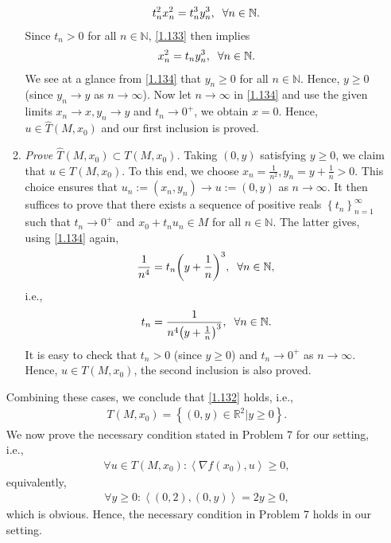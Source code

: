 \documentclass[a4paper]{article}
\numberwithin{equation}{section}
\begin{document}
\begin{enumerate}
\begin{enumerate}
\begin{align}
\label{1.133}
t_n^2x_n^2 = t_n^3y_n^3,\hspace{0.2cm}\forall n \in \mathbb{N}.
\end{align}
Since $t_n>0$ for all $n\in \mathbb{N}$, \eqref{1.133} then implies 
\begin{align}
\label{1.134}
x_n^2 = {t_n}y_n^3,\hspace{0.2cm}\forall n \in \mathbb{N}.
\end{align}
We see at a glance from \eqref{1.134} that $y_n\ge 0$ for all $n\in \mathbb{N}$. Hence, $y\ge 0$ (since $y_n\to y$ as $n\to \infty$). Now let $n\to \infty$ in \eqref{1.134} and use the given limits $x_n\to x,y_n\to y$ and $t_n\to 0^+$, we obtain $x=0$. Hence, $u\in \widehat{T}\left(M,x_0\right)$ and our first inclusion is proved.
\item \textit{Prove $\widehat T\left( {M,{x_0}} \right) \subset T\left( {M,{x_0}} \right)$.} Taking $\left(0,y\right)$ satisfying $y\ge 0$, we claim that $u\in T\left(M,x_0\right)$. To this end, we choose $x_n=\frac{1}{n^2},y_n=y+\frac{1}{n}>0$. This choice ensures that $u_n:=\left(x_n,y_n\right)\to u:=\left(0,y\right)$ as $n\to \infty$. It then suffices to prove that there exists a sequence of positive reals $\left\{ {{t_n}} \right\}_{n = 1}^\infty $ such that $t_n\to 0^+$ and $x_0+t_nu_n\in M$ for all $n\in \mathbb{N}$. The latter gives, using \eqref{1.134} again, 
\begin{align}
\frac{1}{{{n^4}}} = {t_n}{\left( {y + \frac{1}{n}} \right)^3},\hspace{0.2cm}\forall n \in \mathbb{N},
\end{align}
i.e., 
\begin{align}
{t_n} = \frac{1}{{{n^4}{{\left( {y + \frac{1}{n}} \right)}^3}}},\hspace{0.2cm} \forall n \in \mathbb{N}.
\end{align}
It is easy to check that $t_n >0$ (since $y\ge 0$) and $t_n \to 0^+$ as $n\to \infty$. Hence, $u\in T\left(M,x_0\right)$, the second inclusion is also proved.
\end{enumerate}
Combining these cases, we conclude that \eqref{1.132} holds, i.e.,
\begin{align}
T\left( {M,{x_0}} \right) = \left\{ {\left( {0,y} \right) \in {\mathbb{R}^2}|y \ge 0} \right\}.
\end{align}
We now prove the necessary condition stated in Problem 7 for our setting, i.e.,
\begin{align}
\forall u \in T\left( {M,{x_0}} \right):\left\langle {\nabla f\left( {{x_0}} \right),u} \right\rangle  \ge 0,
\end{align}
equivalently,
\begin{align}
\forall y \ge 0:\left\langle {\left( {0,2} \right),\left( {0,y} \right)} \right\rangle  = 2y \ge 0,
\end{align}
which is obvious. Hence, the necessary condition in Problem 7 holds in our setting.
\end{enumerate}
\end{document}
